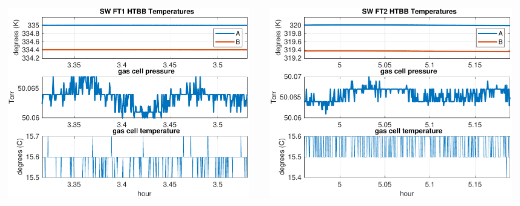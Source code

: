 \documentclass[9pt]{beamer}
\begin{document}
\begin{frame}
\begin{columns}[t]
\begin{column}{0.45\textwidth}
  \begin{centering}
  \includegraphics[width=\textwidth]{harvest_02-11/02-12_SW_FT1.pdf}
  \end{centering}
\end{column}
\begin{column}{0.45\textwidth}  
  \begin{centering}
  \includegraphics[width=\textwidth]{harvest_02-11/02-12_SW_FT2.pdf}
  \end{centering}
\end{column}
\end{columns}

\end{frame}
\end{document}
